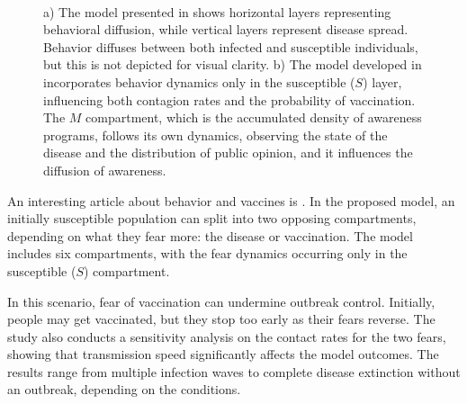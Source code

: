 \begin{figure}[ht]
	\centering
	 \quad
	 \\
	\caption[Mean field models literature review]{a) The model presented in \cite{Tanaka_2002} shows horizontal layers representing behavioral diffusion, while vertical layers represent disease spread. Behavior diffuses between both infected and susceptible individuals, but this is not depicted for visual clarity. b) The model developed in \cite{Zuo2022} incorporates behavior dynamics only in the susceptible ($S$) layer, influencing both contagion rates and the probability of vaccination. The $M$ compartment, which is the accumulated density of awareness programs, follows its own dynamics, observing the state of the disease and the distribution of public opinion, and it influences the diffusion of awareness.}
	\label{fig:mean_models_1}
\end{figure}

\label{par:Epstein}
An interesting article about behavior and vaccines is \cite{Epstein_2021}. In the proposed model, an initially susceptible population can split into two opposing compartments, depending on what they fear more: the disease or vaccination. The model includes six compartments, with the fear dynamics occurring only in the susceptible ($S$) compartment.

In this scenario, fear of vaccination can undermine outbreak control. Initially, people may get vaccinated, but they stop too early as their fears reverse. The study also conducts a sensitivity analysis on the contact rates for the two fears, showing that transmission speed significantly affects the model outcomes. The results range from multiple infection waves to complete disease extinction without an outbreak, depending on the conditions.

